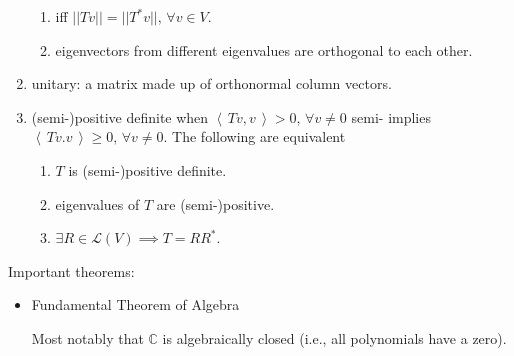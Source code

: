 \documentclass[11pt]{amsart}
\theoremstyle{definition}  %
\newcommand{\C}{\mathbb{C}}
\newcommand{\IP}[1]{\left \langle\, #1 \,\right \rangle}
\newcommand{\LL}{\mathcal{L}}
\begin{document}
\begin{enumerate}
\begin{enumerate}[label=\alph*)]
		\item iff $||Tv||=||T^*v||,\, \forall v \in V$.
		\item eigenvectors from different eigenvalues are orthogonal to each other.
	\end{enumerate}
	\item unitary: a matrix made up of orthonormal column vectors.
	\item (semi-)positive definite when $\IP{Tv,v} > 0,\,\forall v\ne 0$ semi- implies $\IP{Tv.v} \ge 0,\,\forall v\ne 0$.  The following are equivalent
	\begin{enumerate}[label=\roman*)]
		\item $T$ is (semi-)positive definite.
		\item eigenvalues of $T$ are (semi-)positive.
		\item $\exists R \in \LL(V) \implies T=RR^*$.
	\end{enumerate}
\end{enumerate}

Important theorems:
\begin{itemize}
	\item Fundamental Theorem of Algebra
	
		Most notably that $\C$ is algebraically closed (i.e., all polynomials have a zero).
\end{itemize}
\end{document}
